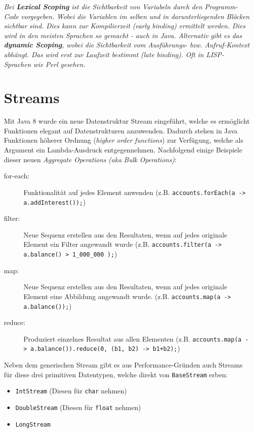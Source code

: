 \textit{Bei \textbf{Lexical Scoping} ist die Sichtbarkeit von Variabeln durch den Programm-Code vorgegeben. Wobei die Variablen im selben und in darunterliegenden Blöcken sichtbar sind. Dies kann zur Kompilierzeit (early binding) ermittelt werden. Dies wird in den meisten Sprachen so gemacht - auch in Java. Alternativ gibt es das \textbf{dynamic Scoping}, wobei die Sichtbarkeit vom Ausführungs- bzw. Aufruf-Kontext abhängt. Das wird erst zur Laufzeit bestimmt (late binding). Oft in LISP-Sprachen wie Perl gesehen.}

\section{Streams}

Mit Java 8 wurde ein neue Datenstruktur Stream eingeführt, welche es ermöglicht Funktionen elegant auf Datenstrukturen anzuwenden. Dadurch stehen in Java Funktionen höherer Ordnung (\textit{higher order functions}) zur Verfügung, welche als Argument ein Lambda-Ausdruck entgegennehmen. Nachfolgend einige Beispiele dieser neuen \textit{Aggregate Operations (aka Bulk Operations)}:
\begin{description}
	\item[for-each:] Funktionalität auf jedes Element anwenden (z.B. \verb|accounts.forEach(a -> a.addInterest());|)
	\item[filter:] Neue Sequenz erstellen aus den Resultaten, wenn auf jedes originale Element ein Filter angewandt wurde (z.B. \verb|accounts.filter(a -> a.balance() > 1_000_000 );|)
	\item[map:] Neue Sequenz erstellen aus den Resultaten, wenn auf jedes originale Element eine Abbildung angewandt wurde. (z.B. \verb|accounts.map(a -> a.balance());|)
	\item[reduce:] Produziert einzelnes Resultat aus allen Elementen (z.B. \verb|accounts.map(a -> a.balance()).reduce(0, (b1, b2) -> b1+b2);|)
\end{description}
Neben dem generischen Stream gibt es aus Performance-Gründen auch Streams für diese drei primitiven Datentypen, welche direkt von \verb|BaseStream| erben:
\begin{itemize}
	\item \verb|IntStream| (Diesen für \verb|char| nehmen)
	\item \verb|DoubleStream| (Diesen für \verb|float| nehmen)
	\item \verb|LongStream|
\end{itemize}
